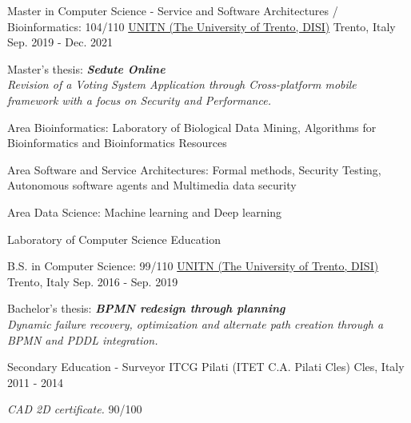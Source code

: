 

\begin{cventries}

\cventry
{Master in Computer Science - Service and Software Architectures / Bioinformatics: 104/110} %
{\href{https://www.unitn.it/}{UNITN (The University of Trento, DISI)}}  %
{Trento, Italy} %
{Sep. 2019 - Dec. 2021} %
{
  \begin{cvitems} %
    \item {Master's thesis: \textbf{\textit{Sedute Online}}\\\textit{Revision of a Voting System Application through Cross-platform mobile framework with a focus on Security and Performance.}}
    \item {Area Bioinformatics: Laboratory of Biological Data Mining, Algorithms for Bioinformatics and Bioinformatics Resources}
    \item {Area Software and Service Architectures: Formal methods, Security Testing, Autonomous software agents and Multimedia data security}
    \item {Area Data Science: Machine learning and Deep learning}
    \item {Laboratory of Computer Science Education}
  \end{cvitems}
}

\cventry
{B.S. in Computer Science: 99/110} %
{\href{https://www.unitn.it/}{UNITN (The University of Trento, DISI)}}  %
{Trento, Italy} %
{Sep. 2016 - Sep. 2019} %
{
  \begin{cvitems} %
    \item {Bachelor's thesis: \textbf{\textit{BPMN redesign through planning}} \\\textit{Dynamic failure recovery, optimization and alternate path creation through a BPMN and PDDL integration.}}
  \end{cvitems}
}

 \cventry
 {Secondary Education - Surveyor} %
 {ITCG Pilati (ITET C.A. Pilati Cles)} %
 {Cles, Italy} %
 {2011 - 2014} %
 {
   \begin{cvitems} %
     \item {\textit{CAD 2D certificate.}  90/100}
   \end{cvitems}
 }
\end{cventries}
